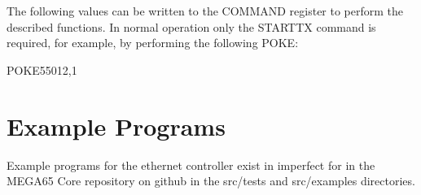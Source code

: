 The following values can be written to the COMMAND register to perform the described functions.
In normal operation only the STARTTX command is required, for example, by performing the following POKE:

\begin{screenoutput}
POKE55012,1
\end{screenoutput}



\section{Example Programs}

Example programs for the ethernet controller exist in imperfect for in the MEGA65 Core repository on github in the src/tests and src/examples directories.
